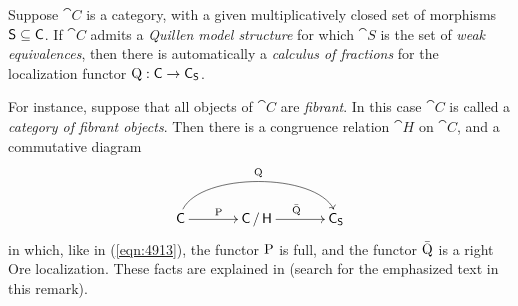 \begin{rem} \label{rem:4205}
Suppose $\cat{C}$ is a category, with a given multiplicatively closed set of 
morphisms $\operatorname{\mathsf{S}} \subseteq \operatorname{\mathsf{C}}$. If $\cat{C}$ admits a {\em Quillen model 
structure} for which $\cat{S}$ is the set of {\em weak equivalences}, then 
there is automatically a {\em calculus of fractions} for the localization
functor $\operatorname{Q} : \operatorname{\mathsf{C}} \to \operatorname{\mathsf{C}}_{\operatorname{\mathsf{S}}}$.

For instance, suppose that all objects of $\cat{C}$ are {\em fibrant}. 
In this case $\cat{C}$ is called a {\em category of fibrant objects}. 
Then there is a congruence relation $\cat{H}$ on $\cat{C}$,
and a commutative diagram 
\[ \UseTips \xymatrix @C=8ex @R=6ex {
\catt{C}
\ar[r]^{\opn{P}}
\ar@(u,u)[rr]^{\opn{Q}}
&
\cat{C} / \cat{H}
\ar[r]^{\bar{\opn{Q}}}
&
\cat{C}_{\cat{S}}
} \]
in which, like in (\ref{eqn:4913}), the functor $\operatorname{P}$ is full, and the 
functor $\bar{\operatorname{Q}}$ is a right Ore localization. 
These facts are explained in \cite{nLab} (search for the emphasized text in 
this remark). 
\end{rem}

